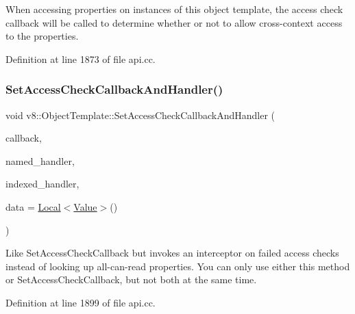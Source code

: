 When accessing properties on instances of this object template, the access check callback will be called to determine whether or not to allow cross-\/context access to the properties. 

Definition at line 1873 of file api.\+cc.

\mbox{\label{classv8_1_1ObjectTemplate_abb8302671bfb5d381f7415336f4e631d}} 
\subsubsection{\texorpdfstring{Set\+Access\+Check\+Callback\+And\+Handler()}{SetAccessCheckCallbackAndHandler()}}
{\footnotesize\ttfamily void v8\+::\+Object\+Template\+::\+Set\+Access\+Check\+Callback\+And\+Handler (\begin{DoxyParamCaption}\item[{\mbox{\hyperlink{namespacev8_a1024fb358d107c1494163217830688e6}{Access\+Check\+Callback}}}]{callback,  }\item[{const \mbox{\hyperlink{structv8_1_1NamedPropertyHandlerConfiguration}{Named\+Property\+Handler\+Configuration}} \&}]{named\+\_\+handler,  }\item[{const \mbox{\hyperlink{structv8_1_1IndexedPropertyHandlerConfiguration}{Indexed\+Property\+Handler\+Configuration}} \&}]{indexed\+\_\+handler,  }\item[{\mbox{\hyperlink{classv8_1_1Local}{Local}}$<$ \mbox{\hyperlink{classv8_1_1Value}{Value}} $>$}]{data = {\ttfamily \mbox{\hyperlink{classv8_1_1Local}{Local}}$<$\mbox{\hyperlink{classv8_1_1Value}{Value}}$>$()} }\end{DoxyParamCaption})}

Like Set\+Access\+Check\+Callback but invokes an interceptor on failed access checks instead of looking up all-\/can-\/read properties. You can only use either this method or Set\+Access\+Check\+Callback, but not both at the same time. 

Definition at line 1899 of file api.\+cc.

\mbox{\label{classv8_1_1ObjectTemplate_a5a99dc7b4895ad486430a4ba6c294136}} 
